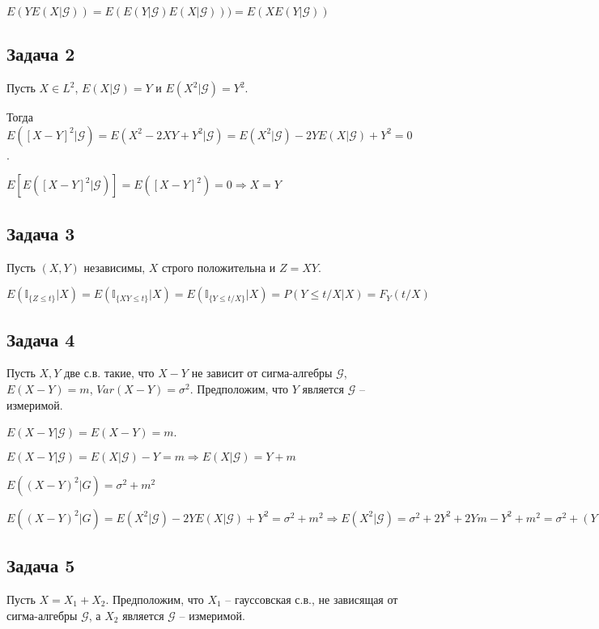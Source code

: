 \documentclass[a4paper,12pt]{article} %
\begin{document}
$E(YE(X|\mathcal{G})) = E(E(Y|\mathcal{G})E(X|\mathcal{G}))) = E(XE(Y|\mathcal{G}))$

\subsection*{Задача 2}

Пусть $X \in L^2$, $E(X|\mathcal{G}) = Y$ и $E(X^2|\mathcal{G}) = Y^2$.

Тогда $E([X-Y]^2|\mathcal{G}) = E(X^2-2XY + Y^2|\mathcal{G}) =  E(X^2|\mathcal{G}) - 2Y E(X|\mathcal{G}) + Y^2 = 0$.

$E[E([X-Y]^2|\mathcal{G})] = E([X-Y]^2)  = 0 \Rightarrow X = Y $ 

\subsection*{Задача 3}

Пусть $(X, Y)$ независимы, $X$ строго положительна и $Z = XY$. 

$E(\mathbb{I}_{\{Z\leq t \}}  |X) = E(\mathbb{I}_{\{XY\leq t \}}  |X) = E(\mathbb{I}_{\{Y\leq t/X \}}  |X) = P(Y\leq t/X |X) = F_Y(t/X)$

\subsection*{Задача 4}

Пусть $X, Y$ две с.в. такие, что $X − Y$ не зависит от сигма-алгебры $\mathcal{G}$, $E(X − Y) = m$,
$Var(X − Y) = \sigma^2$. Предположим, что $Y$ является $\mathcal{G}$ – измеримой. 

$E(X − Y|\mathcal{G}) = E(X − Y) = m$. 

$E(X − Y|\mathcal{G}) = E(X|\mathcal{G})  − Y  = m \Rightarrow E(X|\mathcal{G}) = Y + m$ 

$E((X − Y)^2|G) = \sigma^2 + m^2$

$E((X − Y)^2|G) = E(X^2|\mathcal{G}) - 2YE(X|\mathcal{G}) + Y^2 = \sigma^2 + m^2  \Rightarrow  E(X^2|\mathcal{G}) = \sigma^2  + 2Y^2 + 2Ym - Y^2  + m^2 = \sigma^2 + (Y+m)^2 $ 


\subsection*{Задача 5}

Пусть $X = X_1  + X_2$. Предположим, что $X_1$ – гауссовская с.в., не зависящая от сигма-алгебры $\mathcal{G}$, а $X_2$ является $\mathcal{G}$ – измеримой.
\end{document}
